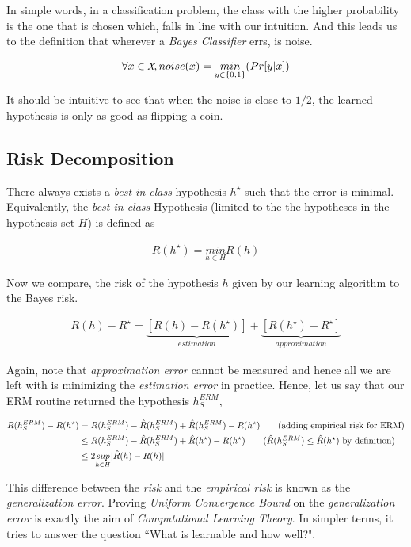 \documentclass[../main]{subfiles}
\begin{document}
In simple words, in a classification problem, the class with the higher probability is the
one that is chosen which, falls in line with our intuition. And this leads us to the definition
that wherever a \textit{Bayes Classifier} errs, is noise.

\begin{definition}[Noise] \label{def:noise}
\begin{align}
\forall x \in \cursive{X}, noise(x) = \underset{y\in\{0,1\}}{min} (Pr[y|x])
\end{align}
\end{definition}

It should be intuitive to see that when the noise is close to $1/2$, the learned hypothesis
is only as good as flipping a coin.

\subsection{Risk Decomposition}

There always exists a \textit{best-in-class} hypothesis $h^\star$ such that the error is
minimal. Equivalently, the \textit{best-in-class} Hypothesis (limited to the the hypotheses
in the hypothesis set $H$) is defined as

\begin{definition}
\begin{align}
R(h^\star) = \underset{h \in H}{min} R(h)
\end{align}
\end{definition}

Now we compare, the risk of the hypothesis $h$ given by our learning algorithm to the
Bayes risk.

\begin{align}
R(h) - R^\star = \underbrace{\left[R(h) - R(h^\star)\right]}_{estimation} + \underbrace{\left[ R(h^\star) - R^\star \right]}_{approximation}
\end{align}

Again, note that \textit{approximation error} cannot be measured and hence all we
are left with is minimizing the \textit{estimation error} in practice. Hence, let us say that
our ERM routine returned the hypothesis $h_S^{ERM}$,

\begin{align}
R(h_S^{ERM}) - R(h^\star) &= R(h_S^{ERM}) - \hat{R}(h_S^{ERM}) + \hat{R}(h_S^{ERM}) - R(h^\star) \tag{adding empirical risk for ERM} \\
&\leq R(h_S^{ERM}) - \hat{R}(h_S^{ERM}) + \hat{R}(h^\star) - R(h^\star) \tag{$\hat{R}(h_S^{ERM}) \leq \hat{R}(h^\star)$ by definition} \\
&\leq 2 \underset{h \in H}{sup} | \hat{R}(h) - R(h) |
\end{align}

This difference between the \textit{risk} and the \textit{empirical risk} is known as the
\textit{generalization error}. Proving \textit{Uniform Convergence Bound} on the
\textit{generalization error} is exactly the aim of \textit{Computational Learning Theory}.
In simpler terms, it tries to answer the question ``What is learnable and how well?".
\end{document}
